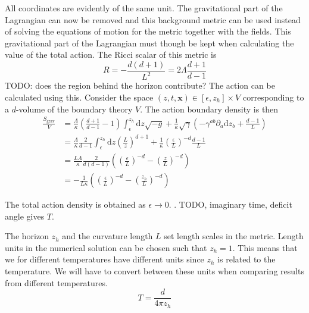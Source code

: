 \documentclass[12pt]{report}
\renewcommand{\d}{\ensuremath{\mathrm{d}}}
\begin{document}
All coordinates are evidently of the same unit. The gravitational part of the Lagrangian can now be removed and this background metric can be used instead of solving the equations of motion for the metric together with the fields. This gravitational part of the Lagrangian must though be kept when calculating the value of the total action. The Ricci scalar of this metric is
\begin{equation}
 R=-\frac{d(d+1)}{L^2}=2\Lambda\frac{d+1}{d-1}
\end{equation}
TODO: does the region behind the horizon contribute?
The action can be calculated using this. Consider the space $(z,t,\mathbf{x})\in[\epsilon,z_h]\times V$ corresponding to a $d$-volume of the boundary theory $V$. The action boundary density is then
\begin{equation}
\begin{split}
 \frac{S_{\mathrm{grav}}}{V}&=\frac{\Lambda}{\kappa}\left(\frac{d+1}{d-1}-1\right)\int_\epsilon^{z_h}\d z\sqrt{-g}+
\frac{1}{\kappa}\sqrt{\gamma}\left(-\gamma^{ab}\partial_a\d z_b+\frac{d-1}{L}\right)\\
&=\frac{\Lambda}{\kappa}\frac{2}{d-1}\int_\epsilon^{z_h}\d z\left(\frac{L}{z}\right)^{d+1}+
\frac{1}{\kappa}\left(\frac{\epsilon}{L}\right)^{-d}\frac{d-1}{L}\\
&=\frac{L\Lambda}{\kappa}\frac{2}{d(d-1)}\left(\left(\frac{\epsilon}{L}\right)^{-d}-\left(\frac{z}{L}\right)^{-d}\right)\\
&=-\frac{1}{L\kappa}\left(\left(\frac{\epsilon}{L}\right)^{-d}-\left(\frac{z_h}{L}\right)^{-d}\right)
\end{split}
\end{equation}

The total action density is obtained as $\epsilon\rightarrow0$.
.  TODO, imaginary time, deficit angle gives $T$.

The horizon $z_h$ and the curvature length $L$ set length scales in the metric. Length units in the numerical solution can be chosen such that $z_h=1$. This means that we for different temperatures have different units since $z_h$ is related to the temperature. We will have to convert between these units when comparing results from different temperatures.\\

\begin{equation}
 T=\frac{d}{4\pi  z_h}\label{T}
\end{equation}
\end{document}
